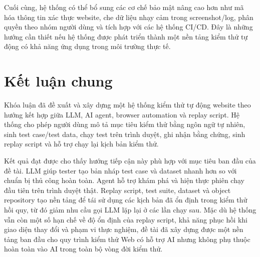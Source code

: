Cuối cùng, hệ thống có thể bổ sung các cơ chế bảo mật nâng cao hơn như mã hóa thông tin xác thực website, che dữ liệu nhạy cảm trong screenshot/log, phân quyền theo nhóm người dùng và tích hợp với các hệ thống CI/CD. Đây là những hướng cần thiết nếu hệ thống được phát triển thành một nền tảng kiểm thử tự động có khả năng ứng dụng trong môi trường thực tế.

\section{Kết luận chung}

Khóa luận đã đề xuất và xây dựng một hệ thống kiểm thử tự động website theo hướng kết hợp giữa LLM, AI agent, browser automation và replay script. Hệ thống cho phép người dùng mô tả mục tiêu kiểm thử bằng ngôn ngữ tự nhiên, sinh test case/test data, chạy test trên trình duyệt, ghi nhận bằng chứng, sinh replay script và hỗ trợ chạy lại kịch bản kiểm thử.

Kết quả đạt được cho thấy hướng tiếp cận này phù hợp với mục tiêu ban đầu của đề tài. LLM giúp tester tạo bản nháp test case và dataset nhanh hơn so với chuẩn bị thủ công hoàn toàn. Agent hỗ trợ khám phá và hiện thực phiên chạy đầu tiên trên trình duyệt thật. Replay script, test suite, dataset và object repository tạo nền tảng để tái sử dụng các kịch bản đã ổn định trong kiểm thử hồi quy, từ đó giảm nhu cầu gọi LLM lặp lại ở các lần chạy sau. Mặc dù hệ thống vẫn còn một số hạn chế về độ ổn định của replay script, khả năng phục hồi khi giao diện thay đổi và phạm vi thực nghiệm, đề tài đã xây dựng được một nền tảng ban đầu cho quy trình kiểm thử Web có hỗ trợ AI nhưng không phụ thuộc hoàn toàn vào AI trong toàn bộ vòng đời kiểm thử.
